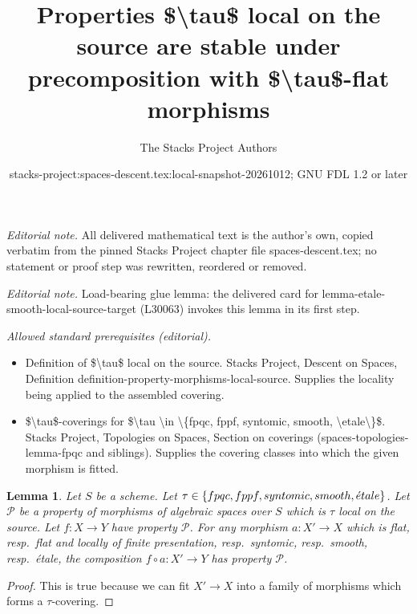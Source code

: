 \documentclass[10pt,a4paper]{amsart}
\title{Properties \$\textbackslash{}tau\$ local on the source are stable under precomposition with \$\textbackslash{}tau\$-flat morphisms}
\author{The Stacks Project Authors}
\date{stacks-project:spaces-descent.tex:local-snapshot-20261012; GNU FDL 1.2 or later}
\theoremstyle{plain}
\newtheorem{lemma}[subsection]{Lemma}
\theoremstyle{definition}
\theoremstyle{remark}
\numberwithin{equation}{subsection}
\def\etale{{\acute{e}tale}}
\begin{document}
\maketitle
\noindent\textit{Editorial note.} All delivered mathematical text is the author's own, copied verbatim from the pinned Stacks Project chapter file spaces-descent.tex; no statement or proof step was rewritten, reordered or removed.\par\medskip
\noindent\textit{Editorial note.} Load-bearing glue lemma: the delivered card for lemma-etale-smooth-local-source-target (L30063) invokes this lemma in its first step.\par\medskip
\noindent\textit{Allowed standard prerequisites (editorial).}\begin{itemize}
\item Definition of \$\textbackslash{}tau\$ local on the source. Stacks Project, Descent on Spaces, Definition definition-property-morphisms-local-source. Supplies the locality being applied to the assembled covering.
\item \$\textbackslash{}tau\$-coverings for \$\textbackslash{}tau \textbackslash{}in \textbackslash{}\{fpqc, fppf, syntomic, smooth, \textbackslash{}etale\textbackslash{}\}\$. Stacks Project, Topologies on Spaces, Section on coverings (spaces-topologies-lemma-fpqc and siblings). Supplies the covering classes into which the given morphism is fitted.
\end{itemize}\medskip
\begin{lemma}
\label{lemma-precompose-property-local-source}
Let $S$ be a scheme.
Let $\tau \in \{fpqc, \linebreak[0] fppf, \linebreak[0] syntomic, \linebreak[0]
smooth, \linebreak[0] \etale\}$.
Let $\mathcal{P}$ be a property of morphisms of algebraic spaces over $S$
which is $\tau$ local on the source. Let $f : X \to Y$ have property
$\mathcal{P}$. For any morphism $a : X' \to X$ which is
flat, resp.\ flat and locally of finite presentation, resp.\ syntomic,
resp.\ smooth, resp.\ \'etale, the composition $f \circ a : X' \to Y$ has
property $\mathcal{P}$.
\end{lemma}

\begin{proof}
This is true because we can fit $X' \to X$ into a family of
morphisms which forms a $\tau$-covering.
\end{proof}
\end{document}

